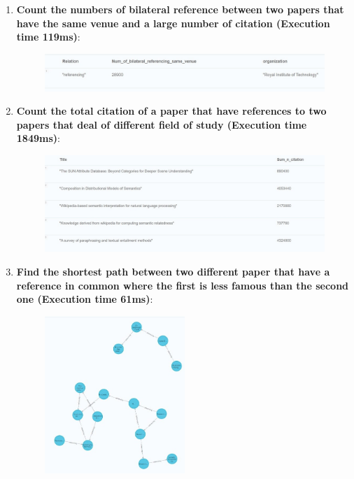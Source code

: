 \documentclass{Configuration_Files/PoliMi3i_thesis}
\begin{document}
\begin{enumerate}
\begin{figure}[H]
    \end{figure}
    \item \textbf{Count the numbers of bilateral reference between two papers that have the same venue and a large  number of citation (Execution time 119ms)}:
    
    \begin{figure}[H]
    \centering
    \includegraphics[width=\textwidth]{Images/queries_neo4j/query_7.jpg}
    \end{figure}
    \item \textbf{Count the total citation of a paper that have references to two papers that deal of different field of study (Execution time 1849ms)}:
    
    \begin{figure}[H]
    \centering
    \includegraphics[width=\textwidth]{Images/queries_neo4j/query_8.jpg}
    \end{figure}
    \item \textbf{Find the shortest path between two different paper that have a reference in common where the first is less famous than the second one (Execution time 61ms)}:
    
    \begin{figure}[H]
    \centering
    \includegraphics[width=0.5\textwidth]{Images/queries_neo4j/query_9.jpg}

\end{figure}
\end{enumerate}
\end{document}
